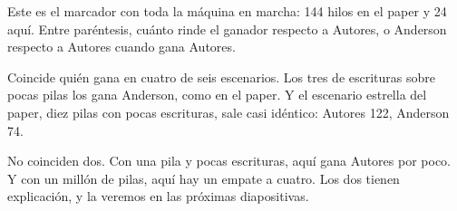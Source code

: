 Este es el marcador con toda la máquina en marcha: 144 hilos en el paper y 24 aquí. Entre paréntesis, cuánto rinde el ganador respecto a Autores, o Anderson respecto a Autores cuando gana Autores.

Coincide quién gana en cuatro de seis escenarios. Los tres de escrituras sobre pocas pilas los gana Anderson, como en el paper. Y el escenario estrella del paper, diez pilas con pocas escrituras, sale casi idéntico: Autores 122, Anderson 74.

No coinciden dos. Con una pila y pocas escrituras, aquí gana Autores por poco. Y con un millón de pilas, aquí hay un empate a cuatro. Los dos tienen explicación, y la veremos en las próximas diapositivas.

